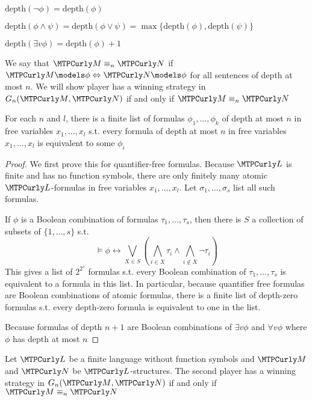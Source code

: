 \documentclass[11pt]{article}
\begin{document}
\(\text{depth}(\neg\phi)=\text{depth}(\phi)\)

\(\text{depth}(\phi\wedge\psi)=\text{depth}(\phi\vee\psi)=
    \max\{\text{depth}(\phi),\text{depth}(\psi)\}\)

\(\text{depth}(\exists v\phi)=\text{depth}(\phi)+1\)

We say that \(\calm\equiv_n\caln\) if
\(\calm\models\phi\Leftrightarrow\caln\models\phi\) for all sentences of
depth at most \(n\). We will show player  has a winning strategy in
\(G_n(\calm,\caln)\) if and only if \(\calm\equiv_n\caln\)

\begin{lemma}[]
For each \(n\) and \(l\), there is a finite list of formulas
\(\phi_1,\dots,\phi_k\) of depth at most \(n\) in free variables
\(x_1,\dots,x_l\) s.t. every formula of depth at most \(n\) in free variables
\(x_1,\dots,x_l\) is equivalent to some \(\phi_i\)
\end{lemma}

\begin{proof}
We first prove this for quantifier-free formulas. Because \(\call\) is
finite and has no function symbols, there are only finitely many atomic
\(\call\)-formulas in free variables \(x_1,\dots,x_l\). Let
\(\sigma_1,\dots,\sigma_s\) list all such formulas.

If \(\phi\) is a Boolean combination of formulas \(\tau_1,\dots,\tau_s\), then
there is \(S\) a collection of subsets of \(\{1,\dots,s\}\) s.t.
\begin{equation*}
\models\phi\leftrightarrow\displaystyle
\bigvee_{X\in S}\left(\bigwedge_{i\in X}\tau_i\wedge
\bigwedge_{i\not\in X}\neg\tau_i
\right)
\end{equation*}
This gives a list of \(2^{2^s}\) formulas s.t. every Boolean combination of
\(\tau_1,\dots,\tau_s\) is equivalent to a formula in this list. In
particular, because quantifier free formulas are Boolean combinations of
atomic formulas, there is a finite list of depth-zero formulas s.t. every
depth-zero formula is equivalent to one in the list.

Because formulas of depth \(n+1\) are Boolean combinations of 
\(\exists v\phi\) and \(\forall v\phi\) where \(\phi\) has depth at most \(n\)
\end{proof}

\begin{lemma}[]
Let \(\call\) be a finite language without function symbols and \(\calm\)
and \(\caln\) be \(\call\)-structures. The second player has a winning
strategy in \(G_n(\calm,\caln)\) if and only if \(\calm\equiv_n\caln\)
\end{lemma}
\end{document}
